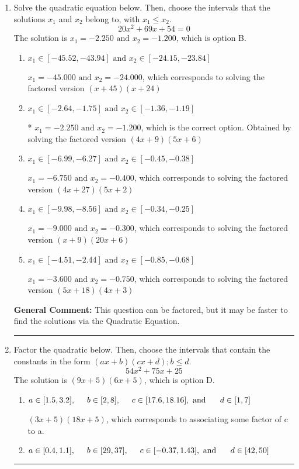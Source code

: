 \documentclass{extbook}[14pt]
\newcommand{\litem}[1]{\item #1

\rule{\textwidth}{0.4pt}}
\begin{document}
\begin{enumerate}\litem{
Solve the quadratic equation below. Then, choose the intervals that the solutions $x_1$ and $x_2$ belong to, with $x_1 \leq x_2$.
\[ 20x^{2} +69 x + 54 = 0 \]The solution is \( x_1 = -2.250 \text{ and } x_2 = -1.200 \), which is option B.\begin{enumerate}[label=\Alph*.]
\item \( x_1 \in [-45.52, -43.94] \text{ and } x_2 \in [-24.15, -23.84] \)

$x_1 = -45.000 \text{ and } x_2 = -24.000$, which corresponds to solving the factored version $(x + 45)(x + 24)$
\item \( x_1 \in [-2.64, -1.75] \text{ and } x_2 \in [-1.36, -1.19] \)

* $x_1 = -2.250 \text{ and } x_2 = -1.200$, which is the correct option. Obtained by solving the factored version $(4x + 9)(5x + 6)$
\item \( x_1 \in [-6.99, -6.27] \text{ and } x_2 \in [-0.45, -0.38] \)

$x_1 = -6.750 \text{ and } x_2 = -0.400$, which corresponds to solving the factored version $(4x + 27)(5x + 2)$
\item \( x_1 \in [-9.98, -8.56] \text{ and } x_2 \in [-0.34, -0.25] \)

$x_1 = -9.000 \text{ and } x_2 = -0.300$, which corresponds to solving the factored version $(x + 9)(20x + 6)$
\item \( x_1 \in [-4.51, -2.44] \text{ and } x_2 \in [-0.85, -0.68] \)

$x_1 = -3.600 \text{ and } x_2 = -0.750$, which corresponds to solving the factored version $(5x + 18)(4x + 3)$
\end{enumerate}

\textbf{General Comment:} This question can be factored, but it may be faster to find the solutions via the Quadratic Equation.
}
\litem{
Factor the quadratic below. Then, choose the intervals that contain the constants in the form $(ax+b)(cx+d); b \leq d.$
\[ 54x^{2} +75 x + 25 \]The solution is \( (9x + 5)(6x + 5) \), which is option D.\begin{enumerate}[label=\Alph*.]
\item \( a \in [1.5, 3.2], \hspace*{5mm} b \in [2, 8], \hspace*{5mm} c \in [17.6, 18.16], \text{ and } \hspace*{5mm} d \in [1, 7] \)

 $(3x + 5)(18x + 5)$, which corresponds to associating some factor of c to a.
\item \( a \in [0.4, 1.1], \hspace*{5mm} b \in [29, 37], \hspace*{5mm} c \in [-0.37, 1.43], \text{ and } \hspace*{5mm} d \in [42, 50] \)


\end{enumerate}}
\end{enumerate}
\end{document}
